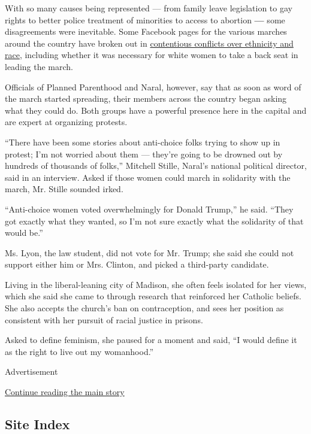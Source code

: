 With so many causes being represented --- from family leave legislation
to gay rights to better police treatment of minorities to access to
abortion \textbf{---} some disagreements were inevitable. Some Facebook
pages for the various marches around the country have broken out in
\href{https://www.nytimes3xbfgragh.onion/2017/01/09/us/womens-march-on-washington-opens-contentious-dialogues-about-race.html?_r=0}{contentious
conflicts over ethnicity and race}, including whether it was necessary
for white women to take a back seat in leading the march.

Officials of Planned Parenthood and Naral, however, say that as soon as
word of the march started spreading, their members across the country
began asking what they could do. Both groups have a powerful presence
here in the capital and are expert at organizing protests.

``There have been some stories about anti-choice folks trying to show up
in protest; I'm not worried about them --- they're going to be drowned
out by hundreds of thousands of folks,'' Mitchell Stille, Naral's
national political director, said in an interview. Asked if those women
could march in solidarity with the march, Mr. Stille sounded irked.

``Anti-choice women voted overwhelmingly for Donald Trump,'' he said.
``They got exactly what they wanted, so I'm not sure exactly what the
solidarity of that would be.''

Ms. Lyon, the law student, did not vote for Mr. Trump; she said she
could not support either him or Mrs. Clinton, and picked a third-party
candidate.

Living in the liberal-leaning city of Madison, she often feels isolated
for her views, which she said she came to through research that
reinforced her Catholic beliefs. She also accepts the church's ban on
contraception, and sees her position as consistent with her pursuit of
racial justice in prisons.

Asked to define feminism, she paused for a moment and said, ``I would
define it as the right to live out my womanhood.''

Advertisement

\protect\hyperlink{after-bottom}{Continue reading the main story}

\hypertarget{site-index}{%
\subsection{Site Index}\label{site-index}}

